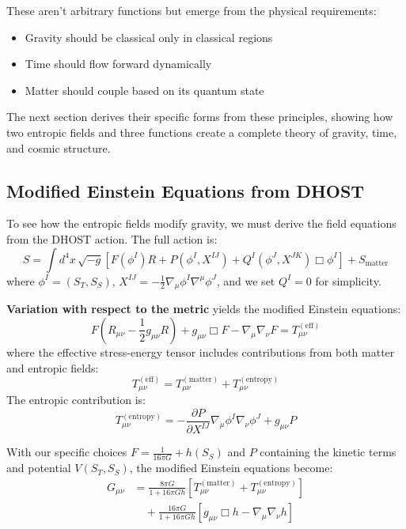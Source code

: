 \documentclass[12pt]{article}
\begin{document}
These aren't arbitrary functions but emerge from the physical requirements:
\begin{itemize}
    \item Gravity should be classical only in classical regions
    \item Time should flow forward dynamically
    \item Matter should couple based on its quantum state
\end{itemize}

The next section derives their specific forms from these principles, showing how two entropic fields and three functions create a complete theory of gravity, time, and cosmic structure.

\subsection{Modified Einstein Equations from DHOST}

To see how the entropic fields modify gravity, we must derive the field equations from the DHOST action. The full action is:
\begin{equation}
    S = \int d^4x\, \sqrt{-g} \left[ F(\phi^I) R + P(\phi^I, X^{IJ}) + Q^I(\phi^J, X^{JK}) \Box \phi^I \right] + S_\mathrm{matter}
\end{equation}
where $\phi^I = (S_T, S_S)$, $X^{IJ} = -\frac{1}{2} \nabla_\mu \phi^I \nabla^\mu \phi^J$, and we set $Q^I = 0$ for simplicity.

\textbf{Variation with respect to the metric} yields the modified Einstein equations:
\begin{equation}
    F \left( R_{\mu\nu} - \frac{1}{2}g_{\mu\nu}R \right) + g_{\mu\nu} \Box F - \nabla_\mu\nabla_\nu F = T^{(\mathrm{eff})}_{\mu\nu}
\end{equation}
where the effective stress-energy tensor includes contributions from both matter and entropic fields:
\begin{equation}
    T^{(\mathrm{eff})}_{\mu\nu} = T^{(\mathrm{matter})}_{\mu\nu} + T^{(\mathrm{entropy})}_{\mu\nu}
\end{equation}
The entropic contribution is:
\begin{equation}
    T^{(\mathrm{entropy})}_{\mu\nu} = - \frac{\partial P}{\partial X^{IJ}} \nabla_\mu \phi^I \nabla_\nu \phi^J + g_{\mu\nu} P
\end{equation}

With our specific choices $F = \frac{1}{16\pi G} + h(S_S)$ and $P$ containing the kinetic terms and potential $V(S_T, S_S)$, the modified Einstein equations become:
\begin{align}
    G_{\mu\nu} &= \frac{8\pi G}{1 + 16\pi G h} \left[ T^{(\mathrm{matter})}_{\mu\nu} + T^{(\mathrm{entropy})}_{\mu\nu} \right]\\
    &\quad + \frac{16\pi G}{1 + 16\pi G h} \left[ g_{\mu\nu} \Box h - \nabla_\mu \nabla_\nu h \right]
\end{align}
\end{document}
